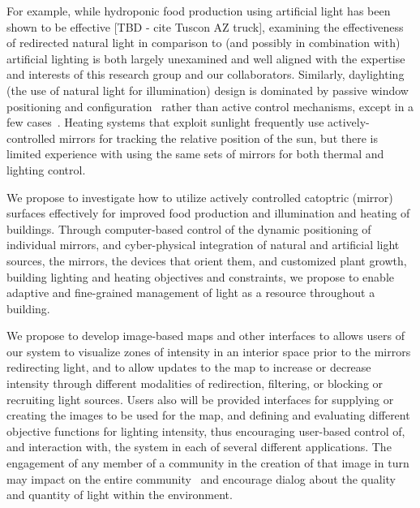 For example, while hydroponic food production using artificial light has been
shown to be effective [TBD - cite Tuscon AZ truck], examining the effectiveness
of redirected natural light in comparison to (and possibly in combination with)
artificial lighting is both largely unexamined and well aligned with the
expertise and interests of this research group and our collaborators.
Similarly, daylighting (the use of natural light for illumination) design is
dominated by passive window positioning and configuration~\cite{vgf+13}
rather than
active control mechanisms, except in a few cases~\cite{kt16}.
Heating systems that
exploit sunlight frequently use actively-controlled mirrors for tracking the
relative position of the sun, but there is limited experience with using the
same sets of mirrors for both thermal and lighting control.

We propose to investigate how to utilize actively controlled catoptric (mirror)
surfaces effectively for improved food production and illumination and heating
of buildings. Through computer-based control of the dynamic positioning of
individual mirrors, and cyber-physical integration of natural and artificial
light sources, the mirrors, the devices that orient them, and customized plant
growth, building lighting and heating objectives and constraints, we propose to
enable adaptive and fine-grained management of light as a resource throughout a
building.

We propose to develop image-based maps and other interfaces to allows users of
our system to visualize zones of intensity in an interior space prior to the
mirrors redirecting light, and to allow updates to the map to increase or
decrease intensity through different modalities of redirection, filtering, or
blocking or recruiting light sources. Users also will be provided interfaces
for supplying or creating the images to be used for the map, and defining and
evaluating different objective functions for lighting intensity, thus
encouraging user-based control of, and interaction with, the system in each of
several different applications. The engagement of any member of a community in
the creation of that image in turn may impact on the entire
community~\cite{BS13} and
encourage dialog about the quality and quantity of light within the
environment.

